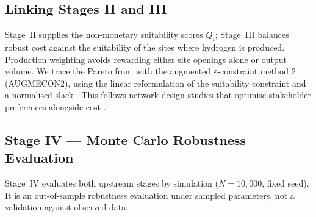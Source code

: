 \documentclass[preprint,12pt,authoryear]{elsarticle}
\begin{document}
\subsection{Linking Stages II and III}
 Stage~II supplies the non-monetary suitability scores $Q_i$; Stage~III balances robust cost against the suitability of the sites where hydrogen is produced. Production weighting avoids rewarding either site openings alone or output volume. We trace the Pareto front with the augmented $\varepsilon$-constraint method 2 (AUGMECON2), using the linear reformulation of the suitability constraint and a normalised slack \citep{mavrotas2009effective,mavrotas2013improved}. This follows network-design studies that optimise stakeholder preferences alongside cost \citep{becker2023integrated,olabi2026dynamic}.

\subsection{Stage IV --- Monte Carlo Robustness Evaluation}
Stage~IV evaluates both upstream stages by simulation ($N = 10{,}000$, fixed seed). It is an out-of-sample robustness evaluation under sampled parameters, not a validation against observed data.
\end{document}
